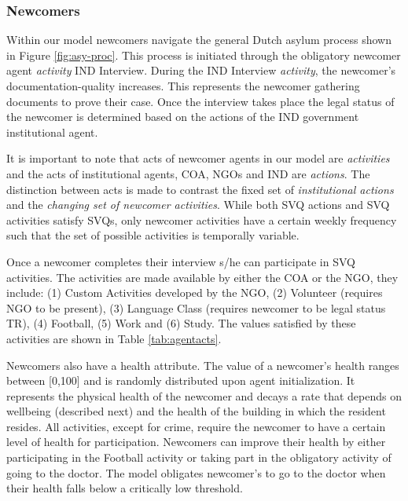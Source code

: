 \documentclass{scspaperproc}
\theoremstyle{scsthe}
\begin{document}
\subsubsection{Newcomers}

Within our model newcomers navigate the general Dutch asylum process shown in Figure \ref{fig:asy-proc}. This process is initiated through the obligatory newcomer agent \emph{activity} IND Interview. During the IND Interview \emph{activity}, the newcomer's documentation-quality increases. This represents the newcomer gathering documents to prove their case. Once the interview takes place the legal status of the newcomer is determined based on the actions of the IND government institutional agent.

It is important to note that acts of newcomer agents in our model are \emph{activities} and the acts of institutional agents, COA, NGOs and IND are \emph{actions}. The distinction between acts is made to contrast the fixed set of \emph{institutional actions} and the \emph{changing set of newcomer activities}. While both SVQ actions and SVQ activities satisfy SVQs, only newcomer activities have a certain weekly frequency such that the set of possible activities is temporally variable.

Once a newcomer completes their interview s/he can participate in SVQ activities. The activities are made available by either the COA or the NGO, they include: (1) Custom Activities developed by the NGO, (2) Volunteer (requires NGO to be present), (3) Language Class (requires newcomer to be legal status TR), (4) Football, (5) Work and (6) Study. The values satisfied by these activities are shown in Table \ref{tab:agentacts}. 

Newcomers also have a health attribute. The value of a newcomer's health ranges between [0,100] and is randomly distributed upon agent initialization. It represents the physical health of the newcomer and decays a rate that depends on wellbeing (described next) and the health of the building in which the resident resides. All activities, except for crime, require the newcomer to have a certain level of health for participation. Newcomers can improve their health by either participating in the Football activity or taking part in the obligatory activity of going to the doctor. The model obligates newcomer's to go to the doctor when their health falls below a critically low threshold.
\end{document}
